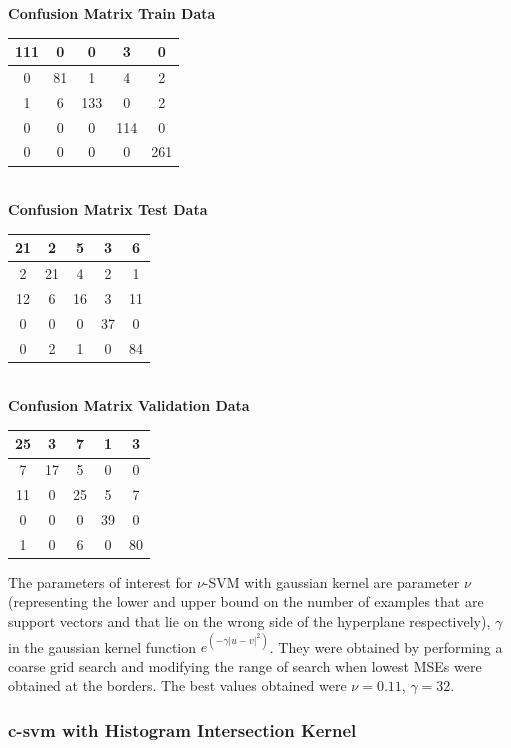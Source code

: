 \documentclass{article}
\begin{document}
\begin{flushleft}
\textbf{Confusion Matrix Train Data\\[5pt]}
\begin{tabular}{|c|c|c|c|c|}
\hline
111 & 0 & 0 & 3 & 0 \\
\hline
0 & 81 & 1 & 4 & 2 \\
\hline
1 & 6 & 133 & 0 & 2\\
\hline
0 & 0 & 0 & 114 & 0\\
\hline
0 & 0 & 0 & 0 & 261 \\
\hline
\end{tabular}
\textbf{\\[10pt] Confusion Matrix Test Data \\[5pt]}
\begin{tabular}{|c|c|c|c|c|}
\hline
21 & 2 & 5 & 3 & 6\\
\hline
2 & 21 & 4 & 2 & 1 \\
\hline
12 & 6 & 16 & 3 & 11 \\
\hline
0 & 0 & 0 & 37 & 0 \\
\hline
0 & 2 & 1 & 0 & 84 \\
\hline
\end{tabular}
\textbf{\\[10pt] Confusion Matrix Validation Data \\[5pt]}
\begin{tabular}{|c|c|c|c|c|}
\hline
25 & 3 & 7 & 1 & 3 \\
\hline
7 & 17 & 5 & 0 & 0 \\
\hline
11 & 0 & 25 & 5 & 7 \\
\hline
0 & 0 & 0 & 39 & 0 \\
\hline
1 & 0 & 6 & 0 & 80 \\
\hline
\end{tabular}
\end{flushleft}

The parameters of interest for $\nu$-SVM with gaussian kernel are parameter $\nu$(representing the lower and upper bound on the number of examples that are support vectors and that lie on the wrong side of the hyperplane respectively), $\gamma$ in the gaussian kernel function $e^{(-\gamma|u-v|^{2})}$. They were obtained by performing a coarse grid search and modifying the range of search when lowest MSEs were obtained at the borders.
The best values obtained were $\nu=0.11$, $\gamma=32$.

\subsubsection{c-svm with Histogram Intersection Kernel}
\end{document}
